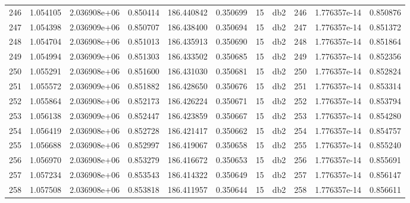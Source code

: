 \begin{tabular}{lrrrrrrlrrr}
246  &    1.054105 &        2.036908e+06 &  0.850414 &              186.440842 &    0.350699 &      15 &          db2 &    246 &   1.776357e-14 &      0.850876 \\
247  &    1.054398 &        2.036909e+06 &  0.850707 &              186.438400 &    0.350694 &      15 &          db2 &    247 &   1.776357e-14 &      0.851372 \\
248  &    1.054704 &        2.036908e+06 &  0.851013 &              186.435913 &    0.350690 &      15 &          db2 &    248 &   1.776357e-14 &      0.851864 \\
249  &    1.054994 &        2.036909e+06 &  0.851303 &              186.433502 &    0.350685 &      15 &          db2 &    249 &   1.776357e-14 &      0.852356 \\
250  &    1.055291 &        2.036908e+06 &  0.851600 &              186.431030 &    0.350681 &      15 &          db2 &    250 &   1.776357e-14 &      0.852824 \\
251  &    1.055572 &        2.036909e+06 &  0.851882 &              186.428650 &    0.350676 &      15 &          db2 &    251 &   1.776357e-14 &      0.853314 \\
252  &    1.055864 &        2.036908e+06 &  0.852173 &              186.426224 &    0.350671 &      15 &          db2 &    252 &   1.776357e-14 &      0.853794 \\
253  &    1.056138 &        2.036909e+06 &  0.852447 &              186.423859 &    0.350667 &      15 &          db2 &    253 &   1.776357e-14 &      0.854280 \\
254  &    1.056419 &        2.036908e+06 &  0.852728 &              186.421417 &    0.350662 &      15 &          db2 &    254 &   1.776357e-14 &      0.854757 \\
255  &    1.056688 &        2.036908e+06 &  0.852997 &              186.419067 &    0.350658 &      15 &          db2 &    255 &   1.776357e-14 &      0.855240 \\
256  &    1.056970 &        2.036908e+06 &  0.853279 &              186.416672 &    0.350653 &      15 &          db2 &    256 &   1.776357e-14 &      0.855691 \\
257  &    1.057234 &        2.036908e+06 &  0.853543 &              186.414322 &    0.350649 &      15 &          db2 &    257 &   1.776357e-14 &      0.856147 \\
258  &    1.057508 &        2.036908e+06 &  0.853818 &              186.411957 &    0.350644 &      15 &          db2 &    258 &   1.776357e-14 &      0.856611 \\

\end{tabular}
